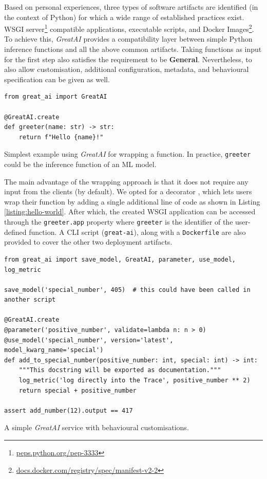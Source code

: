 Based on personal experiences, three types of software artifacts are identified (in the context of Python) for which a wide range of established practices exist. WSGI server\footnote{\href{https://peps.python.org/pep-3333/}{peps.python.org/pep-3333}} compatible applications, executable scripts, and Docker Images\footnote{\href{https://docs.docker.com/registry/spec/manifest-v2-2/}{docs.docker.com/registry/spec/manifest-v2-2}}. To achieve this, \textit{GreatAI} provides a compatibility layer between simple Python inference functions and all the above common artifacts. Taking functions as input for the first step also satisfies the requirement to be \textbf{General}. Nevertheless, to also allow customisation, additional configuration, metadata, and behavioural specification can be given as well.

\begin{listing}[!ht]
\begin{verbatim}
from great_ai import GreatAI

@GreatAI.create
def greeter(name: str) -> str:
    return f"Hello {name}!"
\end{verbatim}
\captionsetup{width=.9\linewidth}
\caption{Simplest example using \textit{GreatAI} for wrapping a function. In practice, \texttt{greeter} could be the inference function of an ML model.}
\label{listing:hello-world}
\end{listing}

The main advantage of the wrapping approach is that it does not require any input from the clients (by default). We opted for a decorator \cite{gamma1995design}, which lets users wrap their function by adding a single additional line of code as shown in Listing \ref{listing:hello-world}. After which, the created WSGI application can be accessed through the \texttt{greeter.app} property where \texttt{greeter} is the identifier of the user-defined function. A CLI script (\texttt{great-ai}), along with a \texttt{Dockerfile} are also provided to cover the other two deployment artifacts.


\begin{listing}
\begin{verbatim}
from great_ai import save_model, GreatAI, parameter, use_model, log_metric

save_model('special_number', 405)  # this could have been called in another script

@GreatAI.create
@parameter('positive_number', validate=lambda n: n > 0)
@use_model('special_number', version='latest', model_kwarg_name='special')
def add_to_special_number(positive_number: int, special: int) -> int:
    """This docstring will be exported as documentation."""
    log_metric('log directly into the Trace', positive_number ** 2)
    return special + positive_number

assert add_number(12).output == 417
\end{verbatim}
\captionsetup{width=.9\linewidth,position=top,skip=-20pt}
\caption{A simple \textit{GreatAI} service with behavioural customisations.}
\label{listing:complex}
\end{listing}


